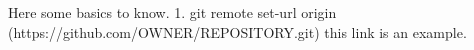 Here some basics to know.
1. git remote set-url origin (https://github.com/OWNER/REPOSITORY.git) this link is an example.
